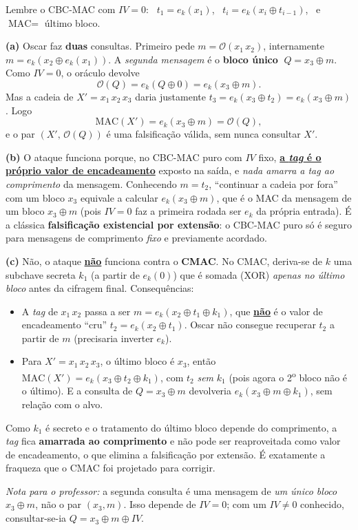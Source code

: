 \documentclass[11pt,a4paper]{article}
\newcommand{\alert}[1]{\textbf{\uline{#1}}}
\newenvironment{resposta}{%
    \begin{respostabox}
    \color{red!70!black}\sloppy
}{%
    \end{respostabox}
}
\begin{document}
\begin{resposta}
Lembre o CBC-MAC com $IV = 0$: \ $t_1 = e_k(x_1)$, \ $t_i = e_k(x_i \oplus t_{i-1})$, \ e $\text{MAC} = $ \'{u}ltimo bloco.

\textbf{(a)} Oscar faz \textbf{duas} consultas. Primeiro pede $m = \mathcal{O}(x_1\,x_2)$, internamente $m = e_k(x_2 \oplus e_k(x_1))$. A \emph{segunda mensagem} \'{e} o \textbf{bloco \'{u}nico} $\;Q = x_3 \oplus m$. Como $IV = 0$, o or\'{a}culo devolve
\[
    \mathcal{O}(Q) = e_k(Q \oplus 0) = e_k(x_3 \oplus m).
\]
Mas a cadeia de $X' = x_1\,x_2\,x_3$ daria justamente $t_3 = e_k(x_3 \oplus t_2) = e_k(x_3 \oplus m)$. Logo
\[
    \text{MAC}(X') = e_k(x_3 \oplus m) = \mathcal{O}(Q),
\]
e o par $(X',\, \mathcal{O}(Q))$ \'{e} uma falsifica\c{c}\~{a}o v\'{a}lida, sem nunca consultar $X'$.

\textbf{(b)} O ataque funciona porque, no CBC-MAC puro com $IV$ fixo, \alert{a \textit{tag} \'{e} o pr\'{o}prio valor de encadeamento} exposto na sa\'{i}da, e \emph{nada amarra a \textit{tag} ao comprimento} da mensagem. Conhecendo $m = t_2$, ``continuar a cadeia por fora'' com um bloco $x_3$ equivale a calcular $e_k(x_3 \oplus m)$, que \'{e} o MAC da mensagem de um bloco $x_3\oplus m$ (pois $IV=0$ faz a primeira rodada ser $e_k$ da pr\'{o}pria entrada). \'{E} a cl\'{a}ssica \textbf{falsifica\c{c}\~{a}o existencial por extens\~{a}o}: o CBC-MAC puro s\'{o} \'{e} seguro para mensagens de comprimento \emph{fixo} e previamente acordado.

\textbf{(c)} N\~{a}o, o ataque \alert{n\~{a}o} funciona contra o \textbf{CMAC}. No CMAC, deriva-se de $k$ uma subchave secreta $k_1$ (a partir de $e_k(0)$) que \'{e} somada (XOR) \emph{apenas no \'{u}ltimo bloco} antes da cifragem final. Consequ\^{e}ncias:
\begin{itemize}
    \item A \textit{tag} de $x_1\,x_2$ passa a ser $m = e_k(x_2 \oplus t_1 \oplus k_1)$, que \alert{n\~{a}o} \'{e} o valor de encadeamento ``cru'' $t_2 = e_k(x_2 \oplus t_1)$. Oscar n\~{a}o consegue recuperar $t_2$ a partir de $m$ (precisaria inverter $e_k$).
    \item Para $X' = x_1\,x_2\,x_3$, o \'{u}ltimo bloco \'{e} $x_3$, ent\~{a}o $\text{MAC}(X') = e_k(x_3 \oplus t_2 \oplus k_1)$, com $t_2$ \emph{sem} $k_1$ (pois agora o 2\textsuperscript{o} bloco n\~{a}o \'{e} o \'{u}ltimo). E a consulta de $Q = x_3 \oplus m$ devolveria $e_k(x_3 \oplus m \oplus k_1)$, sem rela\c{c}\~{a}o com o alvo.
\end{itemize}
Como $k_1$ \'{e} secreto e o tratamento do \'{u}ltimo bloco depende do comprimento, a \textit{tag} fica \textbf{amarrada ao comprimento} e n\~{a}o pode ser reaproveitada como valor de encadeamento, o que elimina a falsifica\c{c}\~{a}o por extens\~{a}o. \'{E} exatamente a fraqueza que o CMAC foi projetado para corrigir.

{\footnotesize\textit{Nota para o professor:} a segunda consulta \'{e} uma mensagem de \emph{um \'{u}nico bloco} $x_3\oplus m$, n\~{a}o o par $(x_3, m)$. Isso depende de $IV=0$; com um $IV \neq 0$ conhecido, consultar-se-ia $Q = x_3 \oplus m \oplus IV$.}
\end{resposta}
\end{document}
